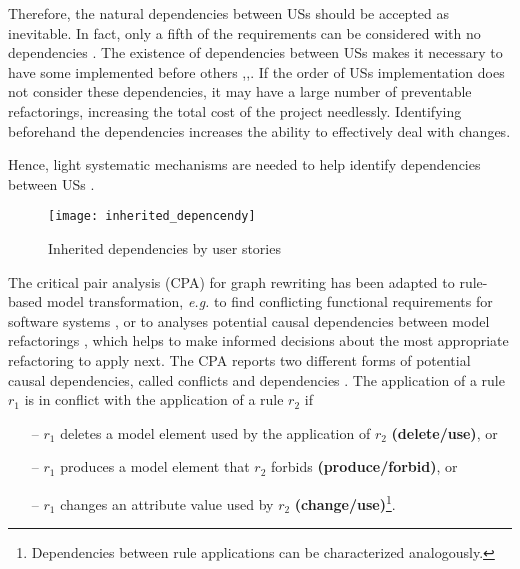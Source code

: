 Therefore, the natural dependencies between USs should be accepted as inevitable. In fact, only a fifth of the requirements can be considered with no dependencies \cite{carlshamre2001industrial}. The existence of dependencies between USs makes it necessary to have some implemented before others \cite{carlshamre2001industrial},\cite{Greer2004},\cite{logue2008handling}. If the order of USs implementation does not consider these dependencies, it may have a large number of preventable refactorings, increasing the total cost of the project needlessly. Identifying beforehand the dependencies increases the ability to effectively deal with changes. 

Hence, light systematic mechanisms are needed to help identify dependencies between USs \cite{gomez2010systematic}.
\begin{figure}[h]
\center
\texttt{[image: inherited\_depencendy]}
\caption{  Inherited dependencies by user stories\cite{gomez2010systematic} }\label{fig:inherited_dependencies}
\end{figure}
The critical pair analysis (CPA) for graph rewriting \cite{hartmanis2006monographs} has been adapted to rule-based model transformation, \emph{e.g.} to find conflicting functional requirements for software systems \cite{hausmann2002detection}, or to analyses potential causal dependencies between model refactorings \cite{mens2007analysing}, which helps to make informed decisions about the most appropriate refactoring to apply next. The CPA reports two different forms of potential causal dependencies, called conflicts and dependencies \cite{born2015analyzing}.
The application of a rule $r_1$ is in conflict with the application of a rule $r_2$ if
\begin{itemize}
\item[--] $r_1$ deletes a model element used by the application of $r_2$ \textbf{(delete/use)}, or
\item[--] $r_1$ produces a model element that $r_2$ forbids \textbf{(produce/forbid)}, or
\item[--] $r_1$ changes an attribute value used by $r_2$ \textbf{(change/use)}\footnote{Dependencies between rule applications can be characterized analogously.}. 
\end{itemize}
